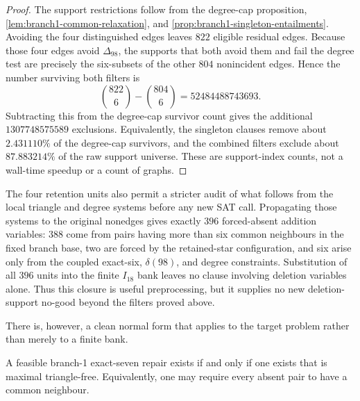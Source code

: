 \begin{proof}
The support restrictions follow from the degree-cap proposition,
\cref{lem:branch1-common-relaxation}, and
\cref{prop:branch1-singleton-entailments}.  Avoiding the four distinguished
edges leaves \(822\) eligible residual edges.  Because those four edges avoid
\(\Delta_{98}\), the supports that both avoid them and fail the degree test
are precisely the six-subsets of the other \(804\) nonincident edges.  Hence
the number surviving both filters is
\[
 \binom{822}{6}-\binom{804}{6}=52484488743693.
\]
Subtracting this from the degree-cap survivor count gives the additional
\(1307748575589\) exclusions.  Equivalently, the singleton clauses remove
about \(2.431110\%\) of the degree-cap survivors, and the combined filters
exclude about \(87.883214\%\) of the raw support universe.  These are
support-index counts, not a wall-time speedup or a count of graphs.
\end{proof}

The four retention units also permit a stricter audit of what follows from
the local triangle and degree systems before any new SAT call.  Propagating
those systems to the original nonedges gives exactly \(396\) forced-absent
addition variables: \(388\) come from pairs having more than six common
neighbours in the fixed branch base, two are forced by the retained-star
configuration, and six arise only from the coupled exact-six,
\(\delta(98)\), and degree constraints.  Substitution of all \(396\) units
into the finite \(I_{18}\) bank leaves no clause involving deletion variables
alone.  Thus this closure is useful preprocessing, but it supplies no new
deletion-support no-good beyond the filters proved above.

There is, however, a clean normal form that applies to the target problem
rather than merely to a finite bank.

\begin{proposition}
\label{prop:branch1-mtf-normal-form}
A feasible branch-1 exact-seven repair exists if and only if one exists that
is maximal triangle-free.  Equivalently, one may require every absent pair to
have a common neighbour.
\end{proposition}

